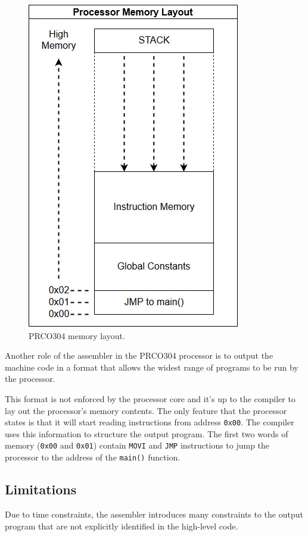 \documentclass[11pt,a4paper]{report}
\newcommand{\scname}{PRCO304}
\begin{document}
\begin{figure}[H]
\begin{center}
\includegraphics[scale=0.4]{prco_memory_layout}
\end{center}
\caption{\scname{} memory layout.}
\label{fig:asm_mem_layout}
\end{figure}

Another role of the assembler in the \scname{} processor is to output the machine code in a format that allows the widest range of programs to be run by the processor.

This format is not enforced by the processor core and it's up to the compiler to lay out the processor's memory contents. The only feature that the processor states is that it will start reading instructions from address \verb|0x00|. The compiler uses this information to structure the output program. The first two words of memory (\verb|0x00| and \verb|0x01|) contain \verb|MOVI| and \verb|JMP| instructions to jump the processor to the address of the \verb|main()| function.

\subsection{Limitations}
Due to time constraints, the assembler introduces many constraints to the output program that are not explicitly identified in the high-level code.
\end{document}
